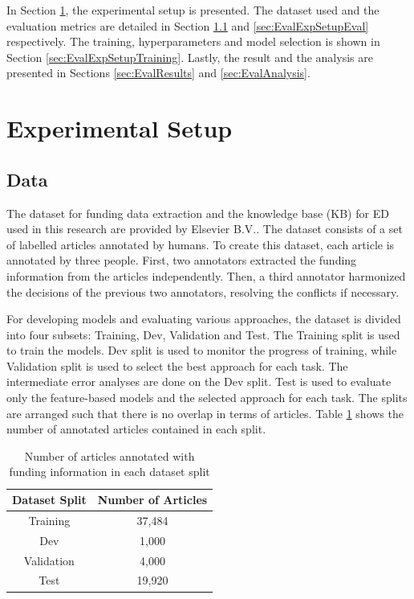 \documentclass{report}
\theoremstyle{definition}
\theoremstyle{remark}
\begin{document}
In Section \ref{sec:EvalExpSetup}, the experimental setup is presented. The dataset used and the evaluation metrics are detailed in Section \ref{sec:EvalExpSetupData} and \ref{sec:EvalExpSetupEval} respectively. The training, hyperparameters and model selection is shown in Section \ref{sec:EvalExpSetupTraining}. Lastly, the result and the analysis are presented in Sections \ref{sec:EvalResults} and \ref{sec:EvalAnalysis}.

\section{Experimental Setup}
\label{sec:EvalExpSetup}

\subsection{Data}
\label{sec:EvalExpSetupData}

The dataset for funding data extraction and the knowledge base (KB) for ED used in this research are provided by Elsevier B.V.. The dataset consists of a set of labelled articles annotated by humans. To create this dataset, each article is annotated by three people. First, two annotators extracted the funding information from the articles independently. Then, a third annotator harmonized the decisions of the previous two annotators, resolving the conflicts if necessary. 

For developing models and evaluating various approaches, the dataset is divided into four subsets: Training, Dev, Validation and Test. The Training split is used to train the models. Dev split is used to monitor the progress of training, while Validation split is used to select the best approach for each task. The intermediate error analyses are done on the Dev split. Test is used to evaluate only the feature-based models and the selected approach for each task. The splits are arranged such that there is no overlap in terms of articles. Table \ref{tab:goldstats} shows the number of annotated articles contained in each split.

\begin{table}[h!]
    \centering
    \begin{tabular}{c c}
    Dataset Split  & Number of Articles  \\
        \hline
    Training &  37,484\\
    Dev & 1,000\\
    Validation & 4,000\\
    Test & 19,920 \\
    \end{tabular}
    \caption{Number of articles annotated with funding information in each dataset split}
    \label{tab:goldstats}
\end{table}
\end{document}
